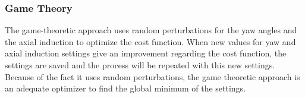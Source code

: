 \subsubsection{Game Theory}
The game-theoretic approach uses random perturbations for the yaw angles and the axial induction to optimize the cost function. When new values for yaw and axial induction settings give an improvement regarding the cost function, the settings are saved and the process will be repeated with this new settings. Because of the fact it uses random perturbations, the game theoretic approach is an adequate optimizer to find the global minimum of the settings.\cite{Dijk2016}





